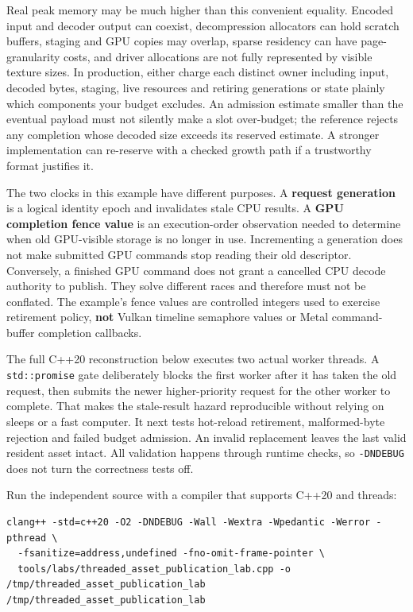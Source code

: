 Real peak memory may be much higher than this convenient equality. Encoded input and decoder output can coexist, decompression allocators can hold scratch buffers, staging and GPU copies may overlap, sparse residency can have page-granularity costs, and driver allocations are not fully represented by visible texture sizes. In production, either charge each distinct owner including input, decoded bytes, staging, live resources and retiring generations or state plainly which components your budget excludes. An admission estimate smaller than the eventual payload must not silently make a slot over-budget; the reference rejects any completion whose decoded size exceeds its reserved estimate. A stronger implementation can re-reserve with a checked growth path if a trustworthy format justifies it.

The two clocks in this example have different purposes. A \textbf{request generation} is a logical identity epoch and invalidates stale CPU results. A \textbf{GPU completion fence value} is an execution-order observation needed to determine when old GPU-visible storage is no longer in use. Incrementing a generation does not make submitted GPU commands stop reading their old descriptor. Conversely, a finished GPU command does not grant a cancelled CPU decode authority to publish. They solve different races and therefore must not be conflated. The example's fence values are controlled integers used to exercise retirement policy, \textbf{not} Vulkan timeline semaphore values or Metal command-buffer completion callbacks.

The full C++20 reconstruction below executes two actual worker threads. A \texttt{std::promise} gate deliberately blocks the first worker after it has taken the old request, then submits the newer higher-priority request for the other worker to complete. That makes the stale-result hazard reproducible without relying on sleeps or a fast computer. It next tests hot-reload retirement, malformed-byte rejection and failed budget admission. An invalid replacement leaves the last valid resident asset intact. All validation happens through runtime checks, so \texttt{-DNDEBUG} does not turn the correctness tests off.

Run the independent source with a compiler that supports C++20 and threads:

\begin{verbatim}
clang++ -std=c++20 -O2 -DNDEBUG -Wall -Wextra -Wpedantic -Werror -pthread \
  -fsanitize=address,undefined -fno-omit-frame-pointer \
  tools/labs/threaded_asset_publication_lab.cpp -o /tmp/threaded_asset_publication_lab
/tmp/threaded_asset_publication_lab
\end{verbatim}

